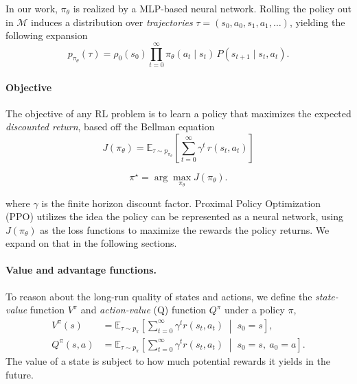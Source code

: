 \documentclass{article}
\theoremstyle{plain}
\theoremstyle{definition}
\theoremstyle{remark}
\begin{document}
In our work, $\pi_\theta$ is realized
by a MLP-based neural network. Rolling the policy out in
$\mathcal{M}$ induces a distribution over \emph{trajectories}
$\tau = (s_0, a_0, s_1, a_1, \dots)$, yielding the following expansion
\begin{equation}
    p_{\pi_\theta}(\tau)
        = \rho_0(s_0) \prod_{t=0}^{\infty}
          \pi_\theta(a_t \mid s_t)\, P(s_{t+1} \mid s_t, a_t).
\end{equation}

\paragraph{Objective}
The objective of any RL problem is to learn a policy that maximizes the expected
\emph{discounted return}, based off the Bellman equation
\begin{equation}
    J(\pi_\theta)
        = \mathbb{E}_{\tau \sim p_{\pi_\theta}}\!\left[
            \sum_{t=0}^{\infty} \gamma^{t}\, r(s_t, a_t)
          \right]
\end{equation}

\begin{equation*}
    \pi^{\star} = \arg\max_{\pi_\theta} J(\pi_\theta).
\end{equation*}

where $\gamma$ is the finite horizon discount factor. Proximal Policy Optimization (PPO) utilizes the idea the policy can be represented as a neural network, using $J(\pi_\theta)$ as the loss functions to maximize the rewards the policy returns. We expand on that in the following sections.

\paragraph{Value and advantage functions.}
To reason about the long-run quality of states and actions, we define the
\emph{state-value} function $V^\pi$ and \emph{action-value} (Q) function $Q^\pi$
under a policy $\pi$,
\begin{align}
    V^{\pi}(s) &= \mathbb{E}_{\tau \sim p_{\pi}}\!\left[
        \sum_{t=0}^{\infty} \gamma^{t} r(s_t, a_t)
        \;\middle|\; s_0 = s \right], \\[2pt]
    Q^{\pi}(s, a) &= \mathbb{E}_{\tau \sim p_{\pi}}\!\left[
        \sum_{t=0}^{\infty} \gamma^{t} r(s_t, a_t)
        \;\middle|\; s_0 = s,\ a_0 = a \right].
\end{align}
The value of a state is subject to how much potential rewards it yields in the future.
\end{document}
